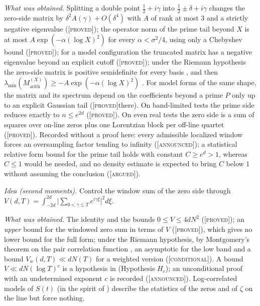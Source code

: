 \documentclass[11pt]{amsart}
\theoremstyle{definition}
\theoremstyle{remark}
\numberwithin{equation}{section}
\newcommand{\stag}[1]{\textsc{[#1]}}
\newcommand{\PROVED}{\stag{proved}}
\newcommand{\COND}{\stag{conditional}}
\newcommand{\ARGUED}{\stag{argued}}
\newcommand{\ANNOUNCED}{\stag{announced}}
\newcommand{\entry}[1]{\par\smallskip\noindent\textit{#1.}\enspace}
\begin{document}
\entry{What was obtained} Splitting a double point $\frac12+i\gamma$ into $\frac12\pm\delta+i\gamma$
changes the zero-side matrix by $\delta^2A(\gamma)+O(\delta^4)$ with $A$ of rank at most $3$ and a
strictly negative eigenvalue \cite[Lemma~3.1 and Theorem~3.2]{P07} (\PROVED); the operator norm of the prime tail
beyond $X$ is at most $A\exp(-\alpha(\log X)^2)$ for every $\alpha<\sigma^2/4$, using only a Chebyshev
bound \cite[Theorem~4.2]{P07} (\PROVED); for a model configuration the truncated matrix has a
negative eigenvalue beyond an explicit cutoff \cite[Theorem~5.1]{P07} (\PROVED); under the Riemann
hypothesis the zero-side matrix is positive semidefinite for every basis \cite[Proposition~6.1(b)]{P07}, and then
$\lambda_{\min}(M^{(X)}_{\mathrm{arith}})\ge-A\exp(-\alpha(\log X)^2)$ \cite[Corollary~6.2]{P07}.
For model forms of the same shape, the matrix and its spectrum depend on the coefficients beyond a
prime $P$ only up to an explicit Gaussian tail \cite[Theorem~4.1]{P09} (\PROVED there). On band-limited tests the
prime side reduces exactly to $n\le e^{2d}$ \cite[Proposition~2.1]{P12} (\PROVED). On even real tests
the zero side is a sum of squares over on-line zeros plus one Lorentzian block per off-line quartet
\cite[Theorem~3.1]{P18} (\PROVED).
Recorded without a proof here: every admissible localized window forces an oversampling factor
tending to infinity (\ANNOUNCED); a statistical relative form bound for the prime tail holds with
constant $C\ge e^{d}>1$, whereas $C\le1$ would be needed, and no density estimate is expected to
bring $C$ below $1$ without assuming the conclusion (\ARGUED).

\entry{Idea (second moments)} Control the window sum of the zero side through
$V(d,T)=\int_{-2d}^{2d}\bigl|\sum_{0<\gamma\le T}e^{i\gamma\xi}\bigr|^2d\xi$.

\entry{What was obtained} The identity and the bounds $0\le V\le4dN^2$ \cite[Theorem~2.1]{P16}
(\PROVED); an \emph{upper} bound for the windowed zero sum in terms of $V$
\cite[Proposition~2.2]{P16} (\PROVED), which gives no lower bound for the full form; under the
Riemann hypothesis, by Montgomery's theorem on the pair correlation function \cite{Montgomery1973},
an asymptotic for the low band and a bound $V_w(d,T)\ll dN(T)$ for a weighted version
\cite[Propositions~3.1 and 4.1]{P16} (\COND). A bound $V\ll dN(\log T)^c$ is a hypothesis in
\cite{P16} (Hypothesis $H_c$); an unconditional proof with an undetermined exponent $c$ is recorded
(\ANNOUNCED). Log-correlated models of
$S(t)$ (in the spirit of \cite{Selberg1946,KeatingSnaith2000}) describe the statistics of the zeros
and of $\zeta$ on the line but force nothing.
\end{document}
